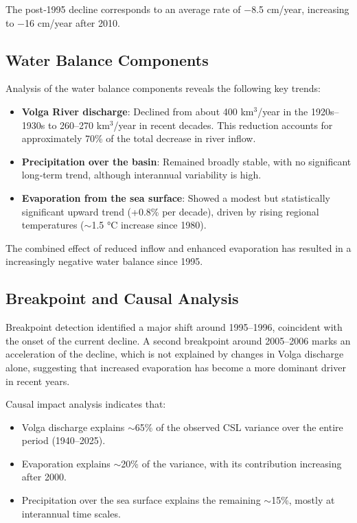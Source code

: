 \documentclass[12pt,a4paper]{article}
\begin{document}
The post‑1995 decline corresponds to an average rate of −8.5 cm/year, increasing to −16 cm/year after 2010.

\subsection{Water Balance Components}

Analysis of the water balance components reveals the following key trends:

\begin{itemize}
    \item \textbf{Volga River discharge}: Declined from about 400 km\(^3\)/year in the 1920s–1930s to 260–270 km\(^3\)/year in recent decades. This reduction accounts for approximately 70\% of the total decrease in river inflow.
    \item \textbf{Precipitation over the basin}: Remained broadly stable, with no significant long‑term trend, although interannual variability is high.
    \item \textbf{Evaporation from the sea surface}: Showed a modest but statistically significant upward trend (+0.8\% per decade), driven by rising regional temperatures ($\sim$1.5 °C increase since 1980).
\end{itemize}

The combined effect of reduced inflow and enhanced evaporation has resulted in a increasingly negative water balance since 1995.

\subsection{Breakpoint and Causal Analysis}

Breakpoint detection identified a major shift around 1995–1996, coincident with the onset of the current decline. A second breakpoint around 2005–2006 marks an acceleration of the decline, which is not explained by changes in Volga discharge alone, suggesting that increased evaporation has become a more dominant driver in recent years.

Causal impact analysis indicates that:

\begin{itemize}
    \item Volga discharge explains $\sim$65\% of the observed CSL variance over the entire period (1940–2025).
    \item Evaporation explains $\sim$20\% of the variance, with its contribution increasing after 2000.
    \item Precipitation over the sea surface explains the remaining $\sim$15\%, mostly at interannual time scales.
\end{itemize}
\end{document}

